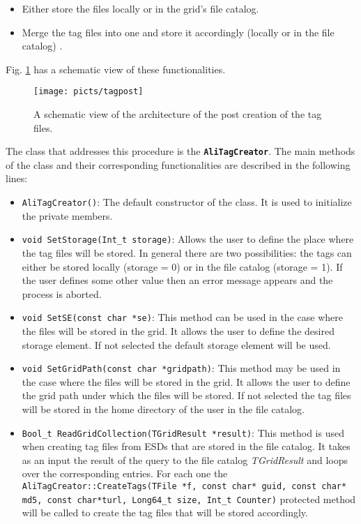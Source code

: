 \documentclass[12pt,a4paper,twoside]{article}
\newcommand{\class}[1]{\texttt{\textbf{#1}}\xspace}
\newcommand{\method}[1]{\texttt{#1}\xspace}
\begin{document}
{\begin{itemize}
\item Either store the files locally or in the grid's file catalog.

\item Merge the tag files into one and store it accordingly (locally
  or in the file catalog) \cite{RootApi}.

\end{itemize}

Fig. \ref{posttag} has a schematic view of these functionalities.


\begin{figure}[ht!]
   \centering
   \texttt{[image: picts/tagpost]}
   \caption{A schematic view of the architecture of the post creation of the tag files.}
   \label{posttag}
\end{figure}

The class that addresses this procedure is the \class{AliTagCreator}. The main methods of the class and their corresponding functionalities are described in the following lines:

\begin{itemize}

\item \method{AliTagCreator()}: The default constructor of the
  class. It is used to initialize the private members.
\item \method{void SetStorage(Int\_t storage)}: Allows the user to
  define the place where the tag files will be stored. In general
  there are two possibilities: the tags can either be stored locally
  (storage = 0) or in the file catalog (storage = 1). If the user
  defines some other value then an error message appears and the
  process is aborted.

\item \method{void SetSE(const char *se)}: This method can be used in
  the case where the files will be stored in the grid. It allows the
  user to define the desired storage element. If not selected the
  default storage element will be used.

\item \method{void SetGridPath(const char *gridpath)}: This method may
  be used in the case where the files will be stored in the grid. It
  allows the user to define the grid path under which the files will
  be stored. If not selected the tag files will be stored in the home
  directory of the user in the file catalog.

\item \method{Bool\_t ReadGridCollection(TGridResult *result)}: This
  method is used when creating tag files from ESDs that are stored in
  the file catalog. It takes as an input the result of the query to
  the file catalog \textit{TGridResult} and loops over the
  corresponding entries. For each one the
  \method{AliTagCreator::CreateTags(TFile *f, const char* guid, const char* md5, const char*turl, Long64\_t size, Int\_t Counter)}
  protected method will be called to create the tag files that will be
  stored accordingly.


\end{itemize}}
\end{document}
